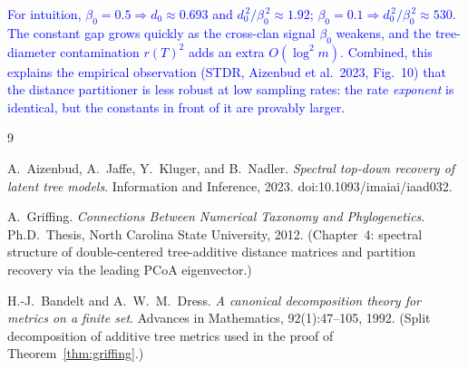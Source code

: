 \documentclass[11pt]{article}
\newcommand{\new}[1]{\textcolor{blue}{#1}}
\theoremstyle{remark}
\newcommand{\1}{\mathbf{1}}
\newcommand{\rT}{r(T)}                %
\begin{document}
\new{For intuition, $\beta_{0} = 0.5 \Rightarrow d_{0} \approx 0.693$
and $d_{0}^{\,2}/\beta_{0}^{\,2} \approx 1.92$; $\beta_{0} = 0.1
\Rightarrow d_{0}^{\,2}/\beta_{0}^{\,2} \approx 530$.  The constant gap
grows quickly as the cross-clan signal $\beta_{0}$ weakens, and the
tree-diameter contamination $\rT^{2}$ adds an extra $O(\log^{2} m)$.
Combined, this explains the empirical observation (STDR, Aizenbud et
al.\ 2023, Fig.~10) that the distance partitioner is less robust at low
sampling rates: the rate \emph{exponent} is identical, but the constants
in front of it are provably larger.}

\begin{thebibliography}{9}

A.~Aizenbud, A.~Jaffe, Y.~Kluger, and B.~Nadler.
\emph{Spectral top-down recovery of latent tree models}.
Information and Inference, 2023. doi:10.1093/imaiai/iaad032.

A.~Griffing.
\emph{Connections Between Numerical Taxonomy and Phylogenetics}.
Ph.D.\ Thesis, North Carolina State University, 2012.
(Chapter~4: spectral structure of double-centered tree-additive
distance matrices and partition recovery via the leading PCoA
eigenvector.)

H.-J.~Bandelt and A.~W.~M.~Dress.
\emph{A canonical decomposition theory for metrics on a finite set}.
Advances in Mathematics, 92(1):47--105, 1992.
(Split decomposition of additive tree metrics used in the proof of
Theorem~\ref{thm:griffing}.)

\end{thebibliography}
\end{document}
